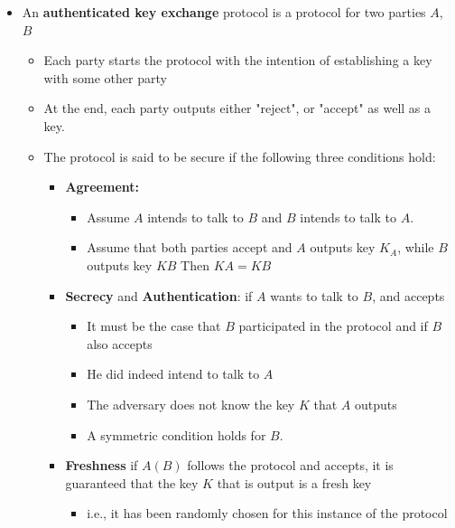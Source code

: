 \documentclass[11pt]{article}
\begin{document}
\begin{itemize}
\item An \textbf{authenticated key exchange} protocol is a protocol for two parties \(A\), \(B\)
\begin{itemize}
\item Each party starts the protocol with the intention of establishing a key with some other party
\item At the end, each party outputs either "reject", or "accept" as well as a key.
\item The protocol is said to be secure if the following three conditions hold:
\begin{itemize}
\item \textbf{Agreement:} 
\begin{itemize}
\item Assume \(A\) intends to talk to \(B\) and \(B\) intends to talk to \(A\).
\item Assume that both parties accept and \(A\) outputs key \(K_A\), while \(B\) outputs key \(KB\) Then \(KA = KB\)
\end{itemize}
\item \textbf{Secrecy} and \textbf{Authentication}: if \(A\) wants to talk to \(B\), and accepts
\begin{itemize}
\item It must be the case that \(B\) participated in the protocol and if \(B\) also accepts
\item He did indeed intend to talk to \(A\)
\item The adversary does not know the key \(K\) that \(A\) outputs
\item A symmetric condition holds for \(B\).
\end{itemize}
\item \textbf{Freshness} if \(A(B)\) follows the protocol and accepts, it is guaranteed that the key \(K\) that is output is a fresh key
\begin{itemize}
\item i.e., it has been randomly chosen for this instance of the protocol
\end{itemize}
\end{itemize}
\end{itemize}
\end{itemize}
\end{document}
